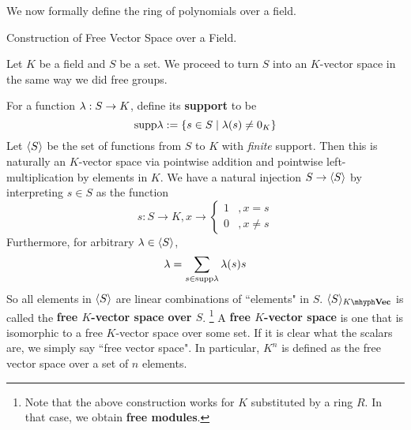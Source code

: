 \documentclass[../../book.tex]{subfiles}
\begin{document}
We now formally define the ring of polynomials over a field.

\begin{ex} Construction of Free Vector Space over a Field. 

    Let $K$ be a field and $S$ be a set. 
    We proceed to turn $S$ into an $K$-vector space 
    in the same way we did free groups.
    
    For a function $\lambda : S \to K$, define its \textbf{support} to be \[
        \mathrm{supp } \lambda := \{s \in S \mid \lambda(s) \neq 0_K\}
    \]
    Let $\langle S \rangle$ be the set of functions from $S$ to $K$ with \emph{finite} support.
    Then this is naturally an $K$-vector space via pointwise addition and
    pointwise left-multiplication by elements in $K$. 
    We have a natural injection $S \to \langle S \rangle$ by
    interpreting $s \in S$ as the function \[
        s : S \to K, x \to \begin{cases}
            1   &, x = s \\
            0   &, x \neq s
        \end{cases}
    \]
    Furthermore, for arbitrary $\lambda \in \langle S \rangle$, \[
        \lambda = \sum_{s \in \mathrm{supp } \lambda} \lambda(s) s
    \]
    So all elements in $\langle S \rangle$ are linear combinations of ``elements" in $S$. 
    $\< S\>_{\KVec}$ is called the \textbf{free $K$-vector space over $S$}.
    \footnote{
        Note that the above construction works for $K$ substituted by a ring $R$.
        In that case, we obtain \textbf{free modules}.
    }
    A \textbf{free $K$-vector space} is one that is isomorphic 
    to a free $K$-vector space over some set. 
    If it is clear what the scalars are, we simply say ``free vector space". 
    In particular, $K^n$ is defined as the free vector space 
    over a set of $n$ elements.
    
\end{ex}
\end{document}
